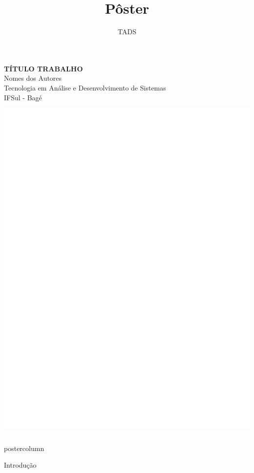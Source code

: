 \documentclass{beamer}
\title{Pôster}
\author{TADS}
\institute{IFSul - Campus Bagé}
\date{}
\newlength{\columnheight}
\begin{document}
\begin{frame}
{\begin{center}
{\Huge \bf TÍTULO TRABALHO} \\ Nomes dos Autores \\ Tecnologia em Análise e Desenvolvimento de Sistemas\\ IFSul - Bagé
\end{center}
\vspace*{-8.5cm}
\hspace*{74.5cm}
\includegraphics[scale=.25]{logo.png}
}
\vspace{2cm}
\begin{columns}
\begin{column}{.49 \textwidth}
\begin{beamercolorbox}[center, wd= \textwidth]{postercolumn}
\begin{minipage}[T]{.95 \textwidth}
\parbox[t][\columnheight]{\textwidth}{
\begin{block}{{\Large Introdução}}

\end{block}}
\end{minipage}
\end{beamercolorbox}
\end{column}
\end{columns}
\end{frame}
\end{document}
